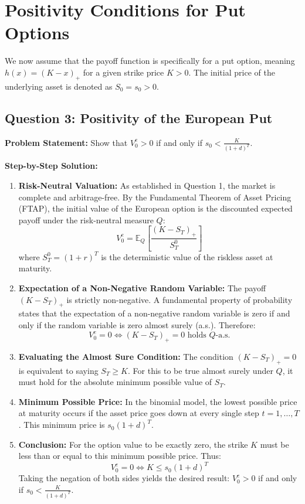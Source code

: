 \section{Positivity Conditions for Put Options}

We now assume that the payoff function is specifically for a put option, meaning $h(x) = (K-x)_+$ for a given strike price $K > 0$. The initial price of the underlying asset is denoted as $S_0 = s_0 > 0$.

\subsection*{Question 3: Positivity of the European Put}

\textbf{Problem Statement:}
Show that $V_0^e > 0$ if and only if $s_0 < \frac{K}{(1+d)^T}$.

\textbf{Step-by-Step Solution:}
\begin{enumerate}
    \item \textbf{Risk-Neutral Valuation:} As established in Question 1, the market is complete and arbitrage-free. By the Fundamental Theorem of Asset Pricing (FTAP), the initial value of the European option is the discounted expected payoff under the risk-neutral measure $Q$:
    \begin{equation*}
        V_0^e = \mathbb{E}_Q \left[ \frac{(K-S_T)_+}{S_T^0} \right]
    \end{equation*}
    where $S_T^0 = (1+r)^T$ is the deterministic value of the riskless asset at maturity.
    
    \item \textbf{Expectation of a Non-Negative Random Variable:} The payoff $(K-S_T)_+$ is strictly non-negative. A fundamental property of probability states that the expectation of a non-negative random variable is zero if and only if the random variable is zero almost surely (a.s.). Therefore:
    \begin{equation*}
        V_0^e = 0 \iff (K-S_T)_+ = 0 \text{ holds } Q\text{-a.s.}
    \end{equation*}
    
    \item \textbf{Evaluating the Almost Sure Condition:} The condition $(K-S_T)_+ = 0$ is equivalent to saying $S_T \ge K$. For this to be true almost surely under $Q$, it must hold for the absolute minimum possible value of $S_T$.
    \item \textbf{Minimum Possible Price:} In the binomial model, the lowest possible price at maturity occurs if the asset price goes down at every single step $t=1,\dots,T$. This minimum price is $s_0(1+d)^T$.
    \item \textbf{Conclusion:} For the option value to be exactly zero, the strike $K$ must be less than or equal to this minimum possible price. Thus:
    \begin{equation*}
        V_0^e = 0 \iff K \le s_0(1+d)^T
    \end{equation*}
    Taking the negation of both sides yields the desired result: $V_0^e > 0$ if and only if $s_0 < \frac{K}{(1+d)^T}$.
\end{enumerate}


